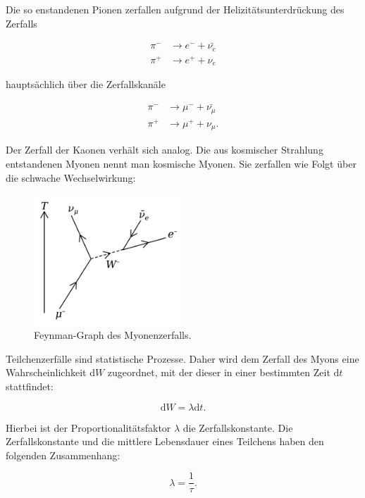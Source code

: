 Die so enstandenen Pionen zerfallen aufgrund der Helizitätsunterdrückung
des Zerfalls

\begin{align}
  \pi^{-} & \rightarrow e^{-} + \bar{\nu_{e}} \\
  \pi^{+} & \rightarrow e^{+} + \nu_{e}
\end{align}

hauptsächlich über die Zerfallskanäle

\begin{align}
\pi^{-} & \rightarrow \mu^{-} + \bar{\nu_{\mu}} \\
\pi^{+} & \rightarrow \mu^{+} + \nu_{\mu}.
\end{align}

Der Zerfall der Kaonen verhält sich analog. Die aus kosmischer Strahlung entstandenen
Myonen nennt man kosmische Myonen.
Sie zerfallen wie Folgt über die schwache Wechselwirkung:

\begin{figure}
  \centering
  \includegraphics[width=0.5\textwidth]{pictures/Muon_Decay.png}
  \caption{Feynman-Graph des Myonenzerfalls.\cite{Myon-Wikipedia}}
  \label{zerfall}
\end{figure}
\noindent

Teilchenzerfälle sind statistische Prozesse. Daher wird dem Zerfall des Myons
eine Wahrscheinlichkeit $\text{d}W$  zugeordnet, mit der dieser in einer bestimmten Zeit $\text{d}t$
stattfindet:

\begin{equation}
  \text{d}W = \lambda \text{d}t.
\end{equation}

Hierbei ist der Proportionalitätsfaktor $\lambda$ die Zerfallskonstante.
Die Zerfallskonstante und die mittlere Lebensdauer eines Teilchens haben den folgenden
Zusammenhang:

\begin{equation}
  \lambda = \frac{1}{\tau}.
\end{equation}

